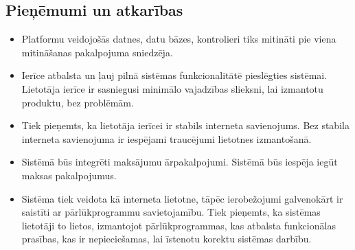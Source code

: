 \subsection{Pieņēmumi un atkarības}
\begin{itemize}
	\item Platformu veidojošās datnes, datu bāzes, kontrolieri tiks mitināti pie viena mitināšanas pakalpojuma sniedzēja.
	\item Ierīce atbalsta un ļauj pilnā sistēmas funkcionalitātē pieslēgties sistēmai. Lietotāja ierīce ir sasniegusi minimālo vajadzības slieksni, lai izmantotu produktu, bez problēmām.
	\item Tiek pieņemts, ka lietotāja ierīcei ir stabils interneta savienojums. Bez stabila interneta savienojuma ir iespējami traucējumi lietotnes izmantošanā.
	\item Sistēmā būs integrēti maksājumu ārpakalpojumi. Sistēmā būs iespēja iegūt maksas pakalpojumus.
	\item Sistēma tiek veidota kā interneta lietotne, tāpēc ierobežojumi galvenokārt ir saistīti ar pārlūkprogrammu savietojamību. Tiek pieņemts, ka sistēmas lietotāji to lietos, izmantojot pārlūkprogrammas, kas atbalsta funkcionālas prasības, kas ir nepieciešamas, lai īstenotu korektu sistēmas darbību.
\end{itemize}
